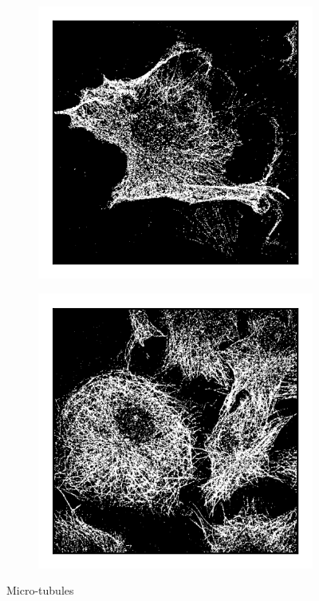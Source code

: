 \begin{figure}
\begin{subfigure}{0.32\textwidth}
        \includegraphics[width=\textwidth]{figures/microtubules_image4.png}
        \caption{}
    \end{subfigure}
    \begin{subfigure}{0.32\textwidth}
        \includegraphics[width=\textwidth]{figures/microtubules_image6.png}
        \caption{}
    \end{subfigure}
    \caption{Micro-tubules}
\end{figure}
